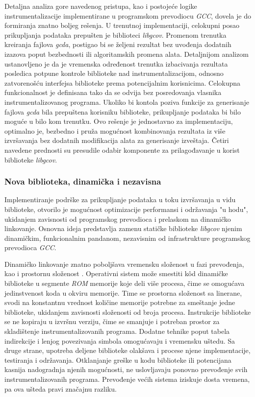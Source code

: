 \documentclass[12pt,oneside]{memoir}
\newcommand{\strano}[1]{\textit{#1}}
\begin{document}
Detaljna analiza gore navedenog pristupa, kao i postojeće logike instrumentalizacije implementirane u programskom prevodiocu \strano{GCC}, dovela je do formiranja znatno boljeg rešenja. U trenutnoj implementaciji, celokupni posao prikupljanja podataka prepušten je biblioteci \strano{libgcov}. Promenom trenutka kreiranja fajlova \strano{gcda}, postigao bi se željeni rezultat bez uvođenja dodatnih izazova poput bezbednosti ili algoritamskih promena alata. Detaljnijom analizom ustanovljeno je da je vremenska određenost trenutka izbacivanja rezultata posledica potpune kontrole biblioteke nad instrumentalizacijom, odnosno zatvorenošću interfejsa biblioteke prema potencijalnim korisnicima. Celokupna funkcionalnost je definisana tako da se odvija bez posredovanja vlasnika instrumentalizovanog programa. Ukoliko bi kontola poziva funkcije za generisanje fajlova \strano{gcda} bila prepuštena korisniku biblioteke, prikupljanje podataka bi bilo moguće u bilo kom trenutku. Ovo rešenje je jednostavno za implementaciju, optimalno je, bezbedno i pruža mogućnost kombinovanja rezultata iz više izvršavanja bez dodatnih modifikacija alata za generisanje izveštaja. Četiri navedene prednosti su presudile odabir komponente za prilagođavanje u korist biblioteke \strano{libgcov}. 


\subsubsection{Nova biblioteka, dinamička i nezavisna}


Implementiranje podrške za prikupljanje podataka u toku izvršavanja u vidu biblioteke, otvorilo je mogućnost optimizacije performansi i održavanja "u hodu", ukidanjem zavisnosti od programskog prevodioca i prelaskom na dinamičko linkovanje. Osnovna ideja predstavlja zamenu statičke biblioteke \strano{libgcov} njenim dinamičkim, funkcionalnim pandanom, nezavisnim od infrastrukture programskog prevodioca \strano{GCC}. 

Dinamičko linkovanje znatno poboljšava vremensku složenost u fazi prevođenja, kao i prostornu složenost \cite{staVSdinLINK}. Operativni sistem može smestiti k\^{o}d dinamičke biblioteke u segmente \strano{ROM} memorije koje deli više procesa, čime se omogućava jedinstvenost koda u okviru memorije. Time se prostorna složenost sa linerane, svodi na konstantnu vrednost količine memorije potrebne za smeštanje jedne biblioteke, ukidanjem zavisnosti složenosti od broja procesa. Instrukcije biblioteke se ne kopiraju u izvršnu verziju, čime se smanjuje i potreban prostor za skladištenje instrumentalizovanih programa. Dodatne tehnike poput tabela indirekcije i lenjog povezivanja simbola omogućavaju i vremensku uštedu. Sa druge strane, upotreba deljene biblioteke olakšava i procese njene implementacije, testiranja i održavanja. Otklanjanje greške u kodu biblioteke ili potencijana kasnija nadogradnja njenih mogućnosti, ne uslovljavaju ponovno prevođenje svih instrumentalizovanih programa. Prevođenje većih sistema iziskuje dosta vremena, pa ova ušteda pravi značajnu razliku. 
\end{document}
